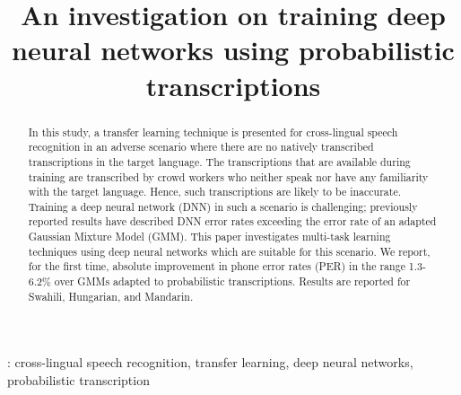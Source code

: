 \documentclass[a4paper]{article}
\title{An investigation on training deep neural networks using probabilistic transcriptions}
\begin{document}
\maketitle

\begin{abstract}
In this study, a transfer learning technique is presented for cross-lingual speech recognition in an adverse  scenario where there are no natively transcribed transcriptions in the target language. The transcriptions that are available during training are transcribed by crowd workers who neither speak nor have any familiarity with the target language. Hence, such transcriptions are likely to be inaccurate. Training a deep neural network (DNN) in such a scenario is challenging; previously reported results have described DNN error rates exceeding the error rate of an adapted Gaussian Mixture Model (GMM). This paper investigates multi-task learning techniques using deep neural networks which are suitable for this scenario.  We report, for the first time, absolute improvement in phone error rates (PER) in the range 1.3-6.2\% over GMMs adapted to probabilistic transcriptions. Results are reported for Swahili, Hungarian, and Mandarin.
\end{abstract}
%
: cross-lingual speech recognition, transfer learning, deep neural networks, probabilistic transcription
\vspace{-3mm}
%
\end{document}

